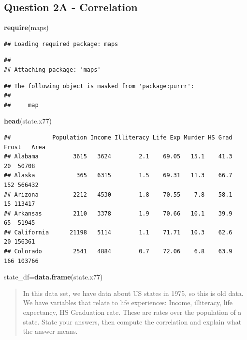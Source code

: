 \documentclass[
]{article}
\newenvironment{Shaded}{\begin{snugshade}}{\end{snugshade}}
\newcommand{\FunctionTok}[1]{\textcolor[rgb]{0.13,0.29,0.53}{\textbf{#1}}}
\newcommand{\NormalTok}[1]{#1}
\newcommand{\OtherTok}[1]{\textcolor[rgb]{0.56,0.35,0.01}{#1}}
\begin{document}
\subsection{Question 2A - Correlation}\label{question-2a---correlation}

\begin{Shaded}
\begin{Highlighting}[]
\FunctionTok{require}\NormalTok{(maps)}
\end{Highlighting}
\end{Shaded}

\begin{verbatim}
## Loading required package: maps
\end{verbatim}

\begin{verbatim}
## 
## Attaching package: 'maps'
\end{verbatim}

\begin{verbatim}
## The following object is masked from 'package:purrr':
## 
##     map
\end{verbatim}

\begin{Shaded}
\begin{Highlighting}[]
\FunctionTok{head}\NormalTok{(state.x77)}
\end{Highlighting}
\end{Shaded}

\begin{verbatim}
##            Population Income Illiteracy Life Exp Murder HS Grad Frost   Area
## Alabama          3615   3624        2.1    69.05   15.1    41.3    20  50708
## Alaska            365   6315        1.5    69.31   11.3    66.7   152 566432
## Arizona          2212   4530        1.8    70.55    7.8    58.1    15 113417
## Arkansas         2110   3378        1.9    70.66   10.1    39.9    65  51945
## California      21198   5114        1.1    71.71   10.3    62.6    20 156361
## Colorado         2541   4884        0.7    72.06    6.8    63.9   166 103766
\end{verbatim}

\begin{Shaded}
\begin{Highlighting}[]
\NormalTok{state\_df}\OtherTok{=}\FunctionTok{data.frame}\NormalTok{(state.x77)}
\end{Highlighting}
\end{Shaded}

\begin{quote}
In this data set, we have data about US states in 1975, so this is old
data. We have variables that relate to life experiences: Income,
illiteracy, life expectancy, HS Graduation rate. These are rates over
the population of a state. State your answers, then compute the
correlation and explain what the answer means.
\end{quote}
\end{document}
